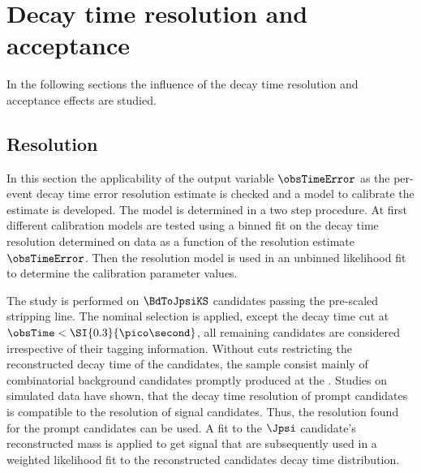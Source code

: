 
\section{Decay time resolution and acceptance}
\label{sec:measurement_of_sin2beta:resolution_and_acceptance}

In the following sections the influence of the decay time resolution and
acceptance effects are studied. 

\subsection{Resolution}
\label{sec:measurement_of_sin2beta:resolution_and_acceptance:resolution}

In this section the applicability of the \dtfpv output variable $\obsTimeError$ as
the per-event decay time error resolution estimate is checked and a model to
calibrate the estimate is developed. The model is determined in a two step
procedure. At first different calibration models are tested using a binned fit
on the decay time resolution determined on data as a function of the resolution
estimate $\obsTimeError$. Then the resolution model is used in an unbinned
likelihood fit to determine the calibration parameter values.

The study is performed on $\BdToJpsiKS$ candidates passing the pre-scaled
stripping line. The nominal selection is applied, except the decay time cut at
$\obsTime < \SI{0.3}{\pico\second}$, all remaining candidates are considered
irrespective of their tagging information. Without cuts restricting the
reconstructed decay time of the \Bd candidates, the sample consist mainly of
combinatorial background candidates promptly produced at the \PV. Studies on
simulated data have shown, that the decay time
resolution of prompt candidates is compatible to the resolution of signal
candidates. Thus, the resolution found for the prompt candidates can be used. A
fit to the $\Jpsi$ candidate's reconstructed mass is applied to get signal
\sweights that are subsequently used in a weighted likelihood fit to the
reconstructed \Bd candidates decay time distribution.

